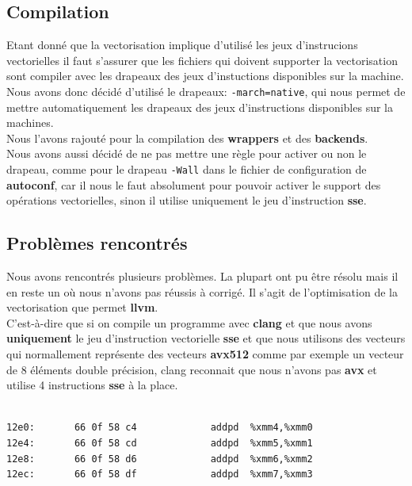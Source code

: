 \documentclass[11pt]{article}
\begin{document}
\subsection{Compilation}
\label{sec:org4d6a33b}

Etant donné que la vectorisation implique d'utilisé les jeux d'instrucions
vectorielles il faut s'assurer que les fichiers qui doivent supporter la
vectorisation sont compiler avec les drapeaux des jeux d'instuctions
disponibles sur la machine.
\\ \vspace{5mm}
Nous avons donc décidé d'utilisé le drapeaux: \texttt{-march=native}, qui nous
permet de mettre automatiquement les drapeaux des jeux d'instructions
disponibles sur la machines.
\\ \vspace{5mm}
Nous l'avons rajouté pour la compilation des \textbf{wrappers} et des \textbf{backends}.
\\ \vspace{5mm}
Nous avons aussi décidé de ne pas mettre une règle pour activer ou non le
drapeau, comme pour le drapeau \texttt{-Wall} dans le fichier de configuration de
\textbf{autoconf}, car il nous le faut absolument pour pouvoir activer le support
des opérations vectorielles, sinon il utilise uniquement le jeu d'instruction
\textbf{sse}.

\subsection{Problèmes rencontrés}
\label{sec:org0f4013c}

Nous avons rencontrés plusieurs problèmes. La plupart ont pu être résolu mais
il en reste un où nous n'avons pas réussis à corrigé. Il s'agit de
l'optimisation de la vectorisation que permet \textbf{llvm}.
\\ \vspace{5mm}
C'est-à-dire que si on compile un programme avec \textbf{clang} et que nous avons
\textbf{uniquement} le jeu d'instruction vectorielle \textbf{sse} et que nous utilisons des
vecteurs qui normallement représente des vecteurs \textbf{avx512} comme par exemple un
vecteur de 8 éléments double précision, clang reconnait que nous n'avons pas
\textbf{avx} et utilise 4 instructions \textbf{sse} à la place.

\begin{verbatim}

12e0:       66 0f 58 c4             addpd  %xmm4,%xmm0
12e4:       66 0f 58 cd             addpd  %xmm5,%xmm1
12e8:       66 0f 58 d6             addpd  %xmm6,%xmm2
12ec:       66 0f 58 df             addpd  %xmm7,%xmm3

\end{verbatim}
\end{document}
